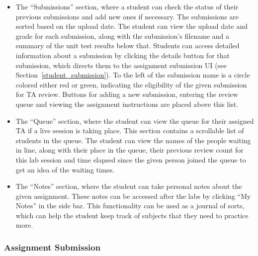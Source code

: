 \documentclass[a4paper, 12pt]{article}
\begin{document}
    \begin{itemize}
      \item The ``Submissions'' section, where a student can check the status of their previous submissions and add new ones if necessary.
            The submissions are sorted based on the upload date. The student can view the upload date and grade for each submission,
            along with the submission's filename and a summary of the unit test results below that. Students can access detailed
            information about a submission by clicking the details button for that submission, which directs them to the
            assignment submission UI (see Section~\ref{student_submission}). To the left of the submission name is a circle colored either red or
            green, indicating the eligibility of the given submission for TA review. Buttons for adding a new submission, entering the
            review queue and viewing the assignment instructions are placed above this list.
      \item The ``Queue'' section, where the student can view the queue for their assigned TA if a live session is taking place. This section
            contains a scrollable list of students in the queue. The student can view the names of the people waiting in line, along with their
            place in the queue, their previous review count for this lab session and time elapsed since the given person joined the queue to get an idea
            of the waiting times.
      \item The ``Notes'' section, where the student can take personal notes about the given assignment. These notes can be accessed
            after the labs by clicking ``My Notes'' in the side bar. This functionality can be used as a journal of sorts, which can
            help the student keep track of subjects that they need to practice more.
    \end{itemize}
    
    \pagebreak
    
    \subsubsection{Assignment Submission}~\label{student_submission}
    
\end{document}
